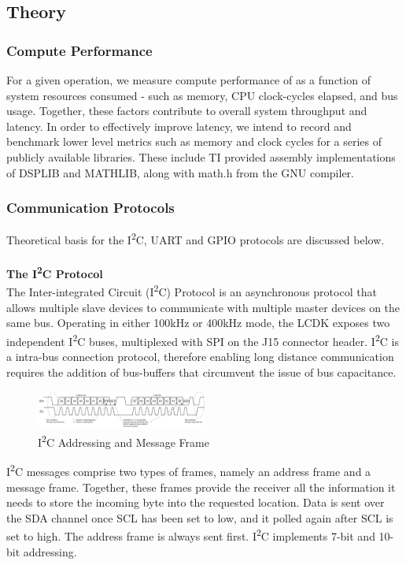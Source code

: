 \subsection{Theory}

\subsubsection{Compute Performance}
For a given operation, we measure compute performance of as a function of system resources consumed - such as memory, CPU clock-cycles elapsed, and bus usage. Together, these factors contribute to overall system throughput and latency. In order to effectively improve latency, we intend to record and benchmark lower level metrics such as memory and clock cycles for a series of publicly available libraries. These include TI provided assembly implementations of DSPLIB and MATHLIB, along with math.h from the GNU compiler.\\

\subsubsection{Communication Protocols} Theoretical basis for the I\textsuperscript{2}C, UART and GPIO protocols are discussed below.\\\\
\textbf{The I\textsuperscript{2}C Protocol}\\
The Inter-integrated Circuit (I\textsuperscript{2}C) Protocol\cite{i2c} is an asynchronous protocol that allows multiple slave devices to communicate with multiple master devices on the same bus. Operating in either 100kHz or 400kHz mode, the LCDK exposes two independent I\textsuperscript{2}C buses, multiplexed with SPI on the J15 connector header. I\textsuperscript{2}C is a intra-bus connection protocol, therefore enabling long distance communication requires the addition of bus-buffers that circumvent the issue of bus capacitance.
\begin{figure}[h!]
  \caption{I\textsuperscript{2}C Addressing and Message Frame}
  \includegraphics[width=0.5\textwidth]{images/i2c_protocol.png}
\end{figure}
I\textsuperscript{2}C messages comprise two types of frames, namely an address frame and a message frame. Together, these frames provide the receiver all the information it needs to store the incoming byte into the requested location. Data is sent over the SDA channel once SCL has been set to low, and it polled again after SCL is set to high. The address frame is always sent first. I\textsuperscript{2}C implements 7-bit and 10-bit addressing. 

